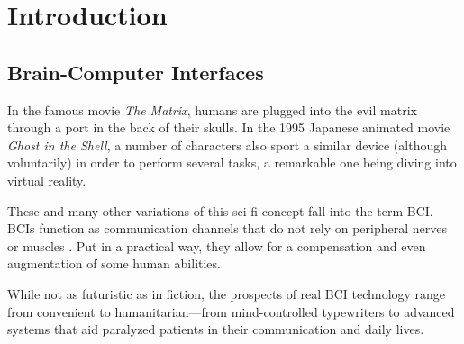 \chapter{Introduction}\label{ch:introduction}

\section{Brain-Computer Interfaces}

	In the famous movie \textit{The Matrix}, humans are plugged into the evil matrix through a port in the back of their skulls. In the 1995 Japanese animated movie \textit{Ghost in the Shell}, a number of characters also sport a similar device (although voluntarily) in order to perform several tasks, a remarkable one being diving into virtual reality.

	These and many other variations of this sci-fi concept fall into the term \ac{BCI}. \acs{BCI}s function as communication channels that do not rely on peripheral nerves or muscles \cite{bcidef}. Put in a practical way, they allow for a compensation and even augmentation of some human abilities.

	While not as futuristic as in fiction, the prospects of real \acs{BCI} technology range from convenient to humanitarian---from mind-controlled typewriters to advanced systems that aid paralyzed patients in their communication and daily lives.